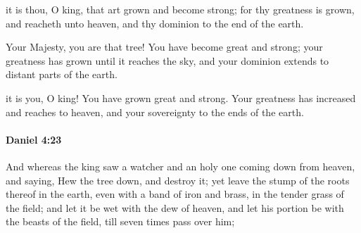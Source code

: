 			\begin{versebox}
					\item[BHS] 
					\item[LXX] 
					\item[ASV] it is thou, O king, that art grown and become strong; for thy greatness is grown, and reacheth unto heaven, and thy dominion to the end of the earth.
					\item[NIV] Your Majesty, you are that tree! You have become great and strong; your greatness has grown until it reaches the sky, and your dominion extends to distant parts of the earth.
					\item[NRSV] it is you, O king! You have grown great and strong. Your greatness has increased and reaches to heaven, and your sovereignty to the ends of the earth.
			\end{versebox}

		\paragraph{Daniel 4:23} %
			\label{DANIEL-4-23}

			And whereas the king saw a watcher and an holy one coming down from heaven, and saying, Hew the tree down, and destroy it; yet leave the stump of the roots thereof in the earth, even with a band of iron and brass, in the tender grass of the field; and let it be wet with the dew of heaven, and let his portion be with the beasts of the field, till seven times pass over him;

